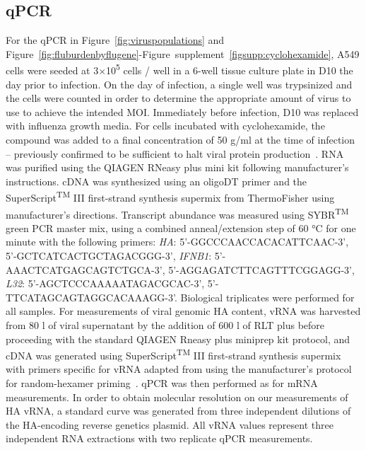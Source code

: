 \documentclass[9pt,lineno]{elife}
\begin{document}
\subsection{qPCR}
For the qPCR in Figure~\ref{fig:viruspopulations} and Figure~\ref{fig:fluburdenbyflugene}-Figure~supplement~\ref{figsupp:cyclohexamide}, A549 cells were seeded at 3$\times$10\textsuperscript{5} cells / well in a 6-well tissue culture plate in D10 the day prior to infection. 
On the day of infection, a single well was trypsinized and the cells were counted in order to determine the appropriate amount of virus to use to achieve the intended MOI.
Immediately before infection, D10 was replaced with influenza growth media.
For cells incubated with cyclohexamide, the compound was added to a final concentration of 50  \si{\micro}g/ml at the time of infection -- previously confirmed to be sufficient to halt viral protein production~\citep{Killip:2014kz}.
RNA was purified using the QIAGEN RNeasy plus mini kit following manufacturer's instructions. 
cDNA was synthesized using an oligoDT primer and the SuperScript\textsuperscript{TM} III first-strand synthesis supermix from ThermoFisher using manufacturer's directions. 
Transcript abundance was measured using SYBR\textsuperscript{TM} green PCR master mix, using a combined anneal/extension step of 60 \si{\degreeCelsius } for one minute with the following primers: \emph{HA}: 5'-GGCCCAACCACACATTCAAC-3', 5'-GCTCATCACTGCTAGACGGG-3', \emph{IFNB1}: 5'-AAACTCATGAGCAGTCTGCA-3', 5'-AGGAGATCTTCAGTTTCGGAGG-3', \emph{L32}: 5'-AGCTCCCAAAAATAGACGCAC-3', 5'-TTCATAGCAGTAGGCACAAAGG-3'.   
Biological triplicates were performed for all samples.
For measurements of viral genomic HA content, vRNA was harvested from 80 \si{\micro}l of viral supernatant by the addition of 600 \si{\micro}l of RLT plus before proceeding with the standard QIAGEN Rneasy plus miniprep kit protocol, and cDNA was generated using  SuperScript\textsuperscript{TM} III first-strand synthesis supermix with primers specific for vRNA adapted from \citep{Hoffmann:2001vj}  using the manufacturer's protocol for random-hexamer priming~\citep{Xue:2017dl}.
qPCR was then performed as for mRNA measurements.
In order to obtain molecular resolution on our measurements of HA vRNA, a standard curve was generated from three independent dilutions of the HA-encoding reverse genetics plasmid. 
All vRNA values represent three independent RNA extractions with two replicate qPCR measurements. 
\end{document}
